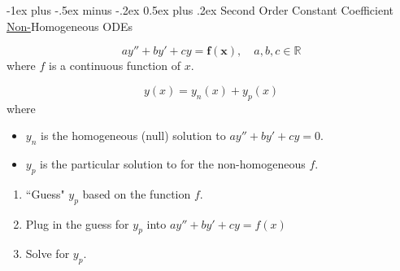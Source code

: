 \documentclass[10pt,landscape,letterpaper]{article}
\makeatletter
\renewcommand{\section}{\@startsection{section}{1}{0mm}%
                                {-1ex plus -.5ex minus -.2ex}%
                                {0.5ex plus .2ex}%
                                {\normalfont\large\bfseries}}
\newcommand\cheatsheetmargin{0.2cm}
\makeatother
\begin{document}
\begin{multicols}{3}
\section{Second Order Constant Coefficient \underline{Non-}Homogeneous ODEs}
\begin{description}[style=unboxed,leftmargin=\cheatsheetmargin]
    \item[Form:]  \begin{equation*} ay'' + by' + cy = \mathbf{f(x)}, \quad a,b,c \in \mathbb{R}\end{equation*}
    where $f$ is a continuous function of $x$.
    \item[Solved by:]
    \begin{equation*} \boxed{y(x) = y_n(x) + y_p(x)}\end{equation*}
    where 
    \begin{itemize}
        \item$y_n$ is the homogeneous (null) solution to $ay'' + by' + cy = 0.$
        \item$y_p$ is the particular solution to for the non-homogeneous $f$.
    \end{itemize}
    \item[To Solve for $y_p$:]
    \begin{enumerate}
        \item ``Guess" $y_p$ based on the function $f$.
        \item Plug in the guess for $y_p$ into $ay'' + by' + cy = f(x)$
        \item Solve for $y_p$.
    \end{enumerate}
\end{description}
    
    \columnbreak
    

\end{multicols}
\end{document}
